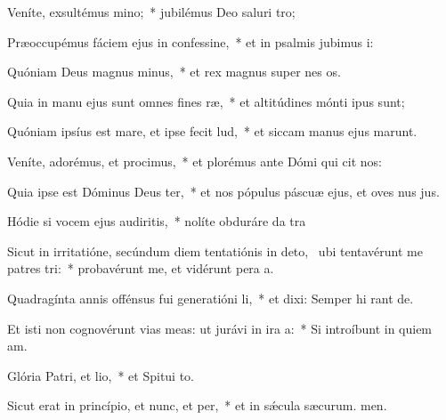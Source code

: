 \item Veníte, exsultémus mino;~* jubilémus Deo saluri tro;
\item Præoccupémus fáciem ejus in confessine,~* et in psalmis jubimus i:
\item Quóniam Deus magnus minus,~* et rex magnus super nes os.
\item Quia in manu ejus sunt omnes fines ræ,~* et altitúdines mónti ipus sunt;
\item Quóniam ipsíus est mare, et ipse fecit lud,~* et siccam manus ejus marunt.
\item Veníte, adorémus, et procimus,~* et plorémus ante Dómi qui cit nos:
\item Quia ipse est Dóminus Deus ter,~* et nos pópulus páscuæ ejus, et oves nus jus.
\item Hódie si vocem ejus audiritis,~* nolíte obduráre da tra
\item Sicut in irritatióne, secúndum diem tentatiónis in deto,~\pscross{} ubi tentavérunt me patres tri:~* probavérunt me, et vidérunt pera a.
\item Quadragínta annis offénsus fui generatióni li,~* et dixi: Semper hi rant de.
\item Et isti non cognovérunt vias meas: ut jurávi in ira a:~* Si introíbunt in quiem am.
\item Glória Patri, et lio,~* et Spitui to.
\item Sicut erat in princípio, et nunc, et per,~* et in sǽcula sæcurum. men.
